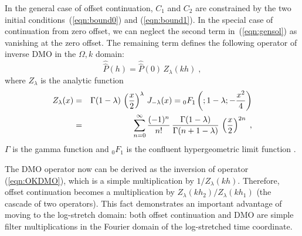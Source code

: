 In the general case of offset continuation, $C_1$ and $C_2$ are
constrained by the two initial conditions~(\ref{eqn:bound0}) and
(\ref{eqn:bound1}). In the special case of continuation from zero offset, we
can neglect the second term in~(\ref{eqn:gensol}) as vanishing at the zero
offset. The remaining term defines the following operator of inverse
DMO in the ${\Omega,k}$ domain:
\begin{equation}
\widehat{\widehat{P}}(h) = \widehat{\widehat{P}}(0)\,Z_{\lambda}(kh)\;,
\label{eqn:OKDMO}
\end{equation}
where $Z_{\lambda}$ is the analytic function
\begin{eqnarray}
\nonumber
Z_{\lambda}(x) & = & \Gamma(1-\lambda)\,\left(x \over 2\right)^{\lambda}\,
J_{-\lambda}(x)=
{}_0F_1\left(;1-\lambda;-\frac{x^2}{4}\right) \\
& = &
\sum_{n=0}^{\infty} {(-1)^n \over n!}\,
{\Gamma(1-\lambda) \over \Gamma(n+1-\lambda)}\,
\left(x \over 2\right)^{2n}\;,
\label{eqn:z}
\end{eqnarray}
$\Gamma$ is the gamma function and ${}_0F_1$ is the confluent
hypergeometric limit function \cite[]{ab}.

The DMO operator now can be derived as the inversion of operator
(\ref{eqn:OKDMO}), which is a simple multiplication by
$1/Z_{\lambda}(kh)$. Therefore, offset continuation becomes a
multiplication by $Z_{\lambda}(kh_2)/Z_{\lambda}(kh_1)$ (the cascade
of two operators). This fact demonstrates an important advantage of
moving to the log-stretch domain: both offset continuation and DMO are simple
filter multiplications in the Fourier domain of the log-stretched time
coordinate.

